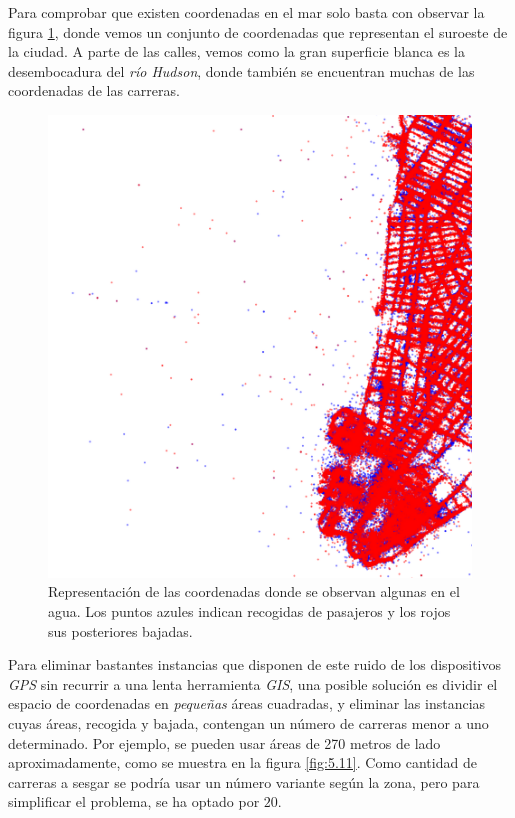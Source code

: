 Para comprobar que existen coordenadas en el mar solo basta con observar la figura \ref{fig:5.10}, donde vemos un conjunto de coordenadas que representan el suroeste de la ciudad. A parte de las calles, vemos como la gran superficie blanca es la desembocadura del \emph{río Hudson}, donde también se encuentran muchas de las coordenadas de las carreras. 

\begin{figure}[H]
  \centering
  \includegraphics[width=140mm]{figures/ch_05/map_2.png}
  \caption{Representación de las coordenadas donde se observan algunas en el agua. Los puntos azules indican recogidas de pasajeros y los rojos sus posteriores bajadas.}
  \label{fig:5.10}
\end{figure}

Para eliminar bastantes instancias que disponen de este ruido de los dispositivos \emph{GPS} sin recurrir a una lenta herramienta \emph{GIS}, una posible solución es dividir el espacio de coordenadas en \emph{pequeñas} áreas cuadradas, y eliminar las instancias cuyas áreas, recogida y bajada, contengan un número de carreras menor a uno determinado. Por ejemplo, se pueden usar áreas de 270 metros de lado aproximadamente, como se muestra en la figura \ref{fig:5.11}. Como cantidad de carreras a sesgar se podría usar un número variante según la zona, pero para simplificar el problema, se ha optado por $20$.


